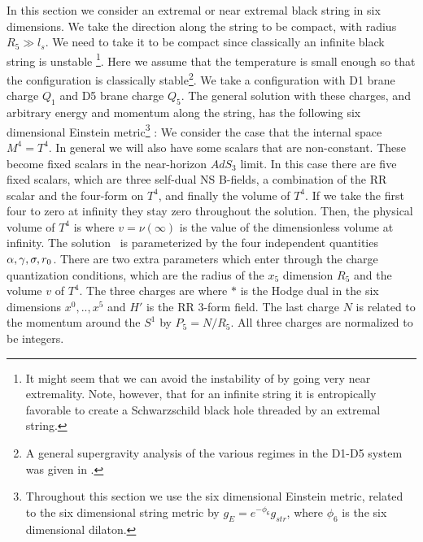 In this section we consider  an extremal or  near extremal black string
in six dimensions. We take the direction along the 
string to be  compact, with radius $R_5 \gg l_s $. We need to take
it to be compact since classically an infinite black string is unstable
\cite{Gregory:1994bj,Gregory:1993vy}\footnote{
It might seem that we can avoid the instability of  
\cite{Gregory:1994bj,Gregory:1993vy} by
going very near extremality. Note, however, that for an infinite
 string it is entropically favorable to create  a Schwarzschild black hole
threaded by an extremal string. }.  Here we assume that the 
temperature is small enough 
so that the configuration is classically
stable\footnote{ A general supergravity analysis of the  
various regimes  in  the D1-D5 system was given in 
\cite{Martinec:1999sa}.}. We take a configuration with D1 brane charge
$Q_1$ and D5 brane charge $Q_5$. The general solution with these
charges, and arbitrary energy and momentum along the string, has
the following six dimensional Einstein  metric\footnote{
Throughout this section we use the six dimensional Einstein metric,
related to the six dimensional string metric by $g_E = e^{-\phi_6}
g_{str}$, where $\phi_6$ is the six dimensional dilaton.} 
\cite{Cvetic:1996xz,Horowitz:1996ay} :
\eqn{metricsix}{\eqalign{
ds^2_{E} = &
 \( 1 + { \sa \over r^2}\)^{-1/2} \( 1 + { \sg \over r^2}\)^{-1/2}
\left[ - dt^2 +dx_5^2
\right. \cr
& \quad \quad +\left. {
r^2_0  \over r^2} (\cosh \sigma dt + \sinh\sigma dx_5)^2
 +\( 1 + {\sa \over r^2}\) ds^2_{M^4} \] \cr
 +& \( 1 + { \sa \over r^2}\)^{1/2}\( 1 + { \sg \over r^2}\)^{1/2} 
\left[
\(1-{r_0^2 \over r^2}\)^{-1} dr^2 + r^2 d \Omega_3^2 \right]~.
}}
We consider the case that the internal space $M^4 = T^4$. 
In general we will also have some scalars that are non-constant. 
These  become fixed scalars in the near-horizon $AdS_3$ limit.
In this case there are five fixed scalars, which are
three self-dual NS B-fields, a combination of the RR scalar and the
four-form on $T^4$, and finally the volume of $T^4$. If we take the
first four to zero at infinity they stay zero throughout the 
solution. Then, the physical volume of $T^4$ is
where $v= \nu(\infty)$ 
is the value of the dimensionless volume at infinity.
The solution \metricsix\
 is parameterized by the four  independent quantities
$\alpha,\gamma,\sigma,r_0$. There are two extra parameters 
which enter through the charge quantization conditions, which are
 the radius of the $x_5$ 
 dimension $R_5$ and the volume $ v$
of $T^4$. The three charges are
where $*$ is the Hodge dual in the six dimensions $x^0,..,x^5$ and
$H'$ is the RR 3-form field.
The last charge $N$ is related to the  momentum around the $S^1$
by $P_5=  N/R_5$. All three charges are normalized to be integers.

